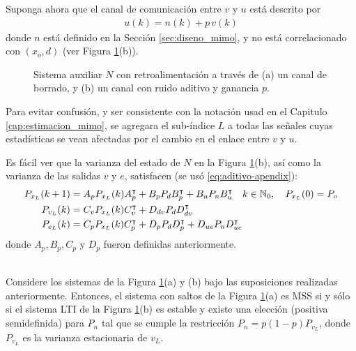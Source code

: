 Suponga ahora que el canal de comunicaci\'on entre $v$ y $u$ est\'a descrito por
\begin{align}\label{eq:aditivo-apendix}
u(k) = n(k) + p\, v(k)
\end{align}
\newpage
\noindent
donde $n$ est\'a definido en la Secci\'on \ref{sec:diseno_mimo}, y no est\'a correlacionado con $(x_o,d)$ (ver Figura \ref{fig:general}(b)).
\begin{figure}
\centering
{}
\caption{Sistema auxiliar $N$ con retroalimentaci\'on a trav\'es de (a) un canal de borrado, y (b) un canal con ruido aditivo y ganancia $p$.}
\label{fig:general}
\end{figure}
Para evitar confusi\'on, y ser consistente con la notaci\'on usad en el Capitulo \ref{cap:estimacion_mimo}, se agregara el sub-\'indice $L$ a todas las se\~nales cuyas estad\'isticas se vean afectadas por el cambio en el enlace entre $v$ y $u$.

Es f\'acil ver que la varianza del estado de $N$ en la Figura \ref{fig:general}(b), as\'i como la varianza de las salidas $v$ y $e$, satisfacen (se us\'o \eqref{eq:aditivo-apendix}):
\begin{align}
\label{eq:PxL} P_{x_L}(k+1) &= A_pP_{x_L}(k)A_p^{\intercal} + B_pP_dB_p^{\intercal} + B_u P_n B_u^{\intercal} \quad k\in\mathbb{N}_0, \quad P_{x_L}(0)=P_o \\
\label{eq:PvL} P_{v_L}(k) & = C_v P_{x_L}(k) C_v^{\intercal} + D_{dv}P_dD_{dv}^{\intercal} \\
\label{eq:PeL} P_{e_L}(k) & = C_p P_{x_L}(k) C_p^{\intercal} + D_p P_d D_p^{\intercal} + D_{ue} P_n D_{ue}^{\intercal}
\end{align}
donde $A_p, B_p, C_p$ y $D_p$ fueron definidas anteriormente.

\begin{lema}\label{lema:estabilidad-apendice}{\ \\}
Considere los sistemas de la Figura \ref{fig:general}(a) y (b) bajo las suposiciones realizadas anteriormente. Entonces, el sistema con saltos de la Figura \ref{fig:general}(a) es MSS si y s\'olo si el sistema LTI de la Figura \ref{fig:general}(b) es estable y existe una elecci\'on (positiva semidefinida) para $P_n$ tal que se cumple la restricci\'on $P_n=p(1-p)P_{v_L}$, donde $P_{v_L}$ es la varianza estacionaria de $v_L$.
\end{lema}

